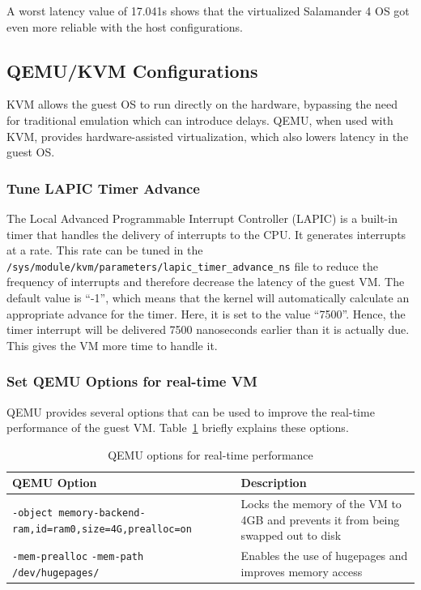 \documentclass[MMR,Master,english]{twbook}
\begin{document}
\noindent A worst latency value of 17.041\textmu s shows that the virtualized Salamander 4 OS got even more reliable with the host configurations.

\clearpage

\subsection{QEMU/KVM Configurations}\label{subsec:guest_configurations}
KVM allows the guest OS to run directly on the hardware, bypassing the need for traditional emulation which can introduce delays. QEMU, when used with KVM, provides hardware-assisted virtualization, which also lowers latency in the guest OS.

\subsubsection{Tune LAPIC Timer Advance}
The Local Advanced Programmable Interrupt Controller (LAPIC) is a built-in timer that handles the delivery of interrupts to the CPU.
It generates interrupts at a rate. This rate can be tuned in the \texttt{/sys/module/kvm/parameters/lapic\_timer\_advance\_ns} file to reduce the frequency of interrupts and therefore decrease the latency of the guest VM. The default value is ``-1'', which means that the kernel will automatically calculate an appropriate advance for the timer. Here, it is set to the value ``7500''. Hence, the timer interrupt will be delivered 7500 nanoseconds earlier than it is actually due. This gives the VM more time to handle it.

\subsubsection{Set QEMU Options for real-time VM}
QEMU provides several options that can be used to improve the real-time performance of the guest VM. Table~\ref{tab:qemu_options} briefly explains these options.

\begin{table}[H]
	\centering
	\caption{QEMU options for real-time performance}
	\label{tab:qemu_options}
	\setlength{\tabcolsep}{0.5em} %
	{\renewcommand{\arraystretch}{1.2}%
		\begin{tabular}{|p{6.5cm}|p{8cm}|}
			\hline
			\textbf{QEMU Option}                                                             & \textbf{Description}                                                             \\\hline
			\texttt{-object memory-backend-ram,}\newline\texttt{id=ram0,size=4G,prealloc=on} & Locks the memory of the VM to 4GB and prevents it from being swapped out to disk \\\hline
			\texttt{-mem-prealloc} \newline \texttt{-mem-path /dev/hugepages/}               & Enables the use of hugepages and improves \newline memory access                 \\\hline
		\end{tabular}}
\end{table}
\end{document}
